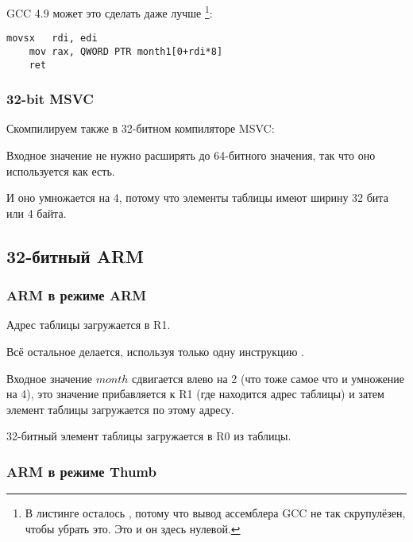 \Optimizing GCC 4.9 может это сделать даже лучше
\footnote{В листинге осталось , потому что вывод ассемблера GCC не так скрупулёзен, чтобы убрать это.
Это  и он здесь нулевой.}:

\begin{lstlisting}[caption=\Optimizing GCC 4.9 x64]
	movsx	rdi, edi
	mov	rax, QWORD PTR month1[0+rdi*8]
	ret
\end{lstlisting}

\subsubsection{32-bit MSVC}

Скомпилируем также в 32-битном компиляторе MSVC:



Входное значение не нужно расширять до 64-битного значения, так что оно используется как есть.

И оно умножается на 4, потому что элементы таблицы имеют ширину 32 бита или 4 байта.

\subsection{32-битный ARM}

\subsubsection{ARM в режиме ARM}



Адрес таблицы загружается в R1.

Всё остальное делается, используя только одну инструкцию \LDR.

Входное значение $month$ сдвигается влево на 2 (что тоже самое что и умножение на 4), это значение
прибавляется к R1 (где находится адрес таблицы) и затем элемент таблицы загружается по этому адресу.

32-битный элемент таблицы загружается в R0 из таблицы.

\subsubsection{ARM в режиме Thumb}

